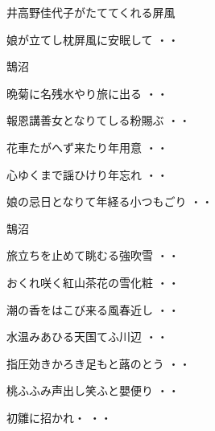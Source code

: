 \vspace{0.6cm}
井高野佳代子がたててくれる屏風
\begin{shiika}娘が立てし枕屏風に安眠して
\hfill{・・}\end{shiika}
\vspace{0.6cm}
鵠沼
\begin{shiika}晩菊に名残水やり旅に出る
\hfill{・・}\end{shiika}
\begin{shiika}報恩講善女となりてしる粉賜ぶ
\hfill{・・}\end{shiika}
\begin{shiika}花車たがへず来たり年用意
\hfill{・・}\end{shiika}
\begin{shiika}心ゆくまで謡ひけり年忘れ
\hfill{・・}\end{shiika}
\begin{shiika}娘の忌日となりて年経る小つもごり
\hfill{・・}\end{shiika}
\vspace{0.6cm}
鵠沼
\begin{shiika}旅立ちを止めて眺むる強吹雪
\hfill{・・}\end{shiika}
\begin{shiika}おくれ咲く紅山茶花の雪化粧
\hfill{・・}\end{shiika}
\begin{shiika}潮の香をはこび来る風春近し
\hfill{・・}\end{shiika}
\begin{shiika}水温みあひる天国てふ川辺
\hfill{・・}\end{shiika}
\begin{shiika}指圧効きかろき足もと蕗のとう
\hfill{・・}\end{shiika}
\begin{shiika}桃ふふみ声出し笑ふと嬰便り
\hfill{・・}\end{shiika}
\begin{shiika}初雛に招かれ・
\hfill{・・}\end{shiika}
\vspace{0.6cm}

